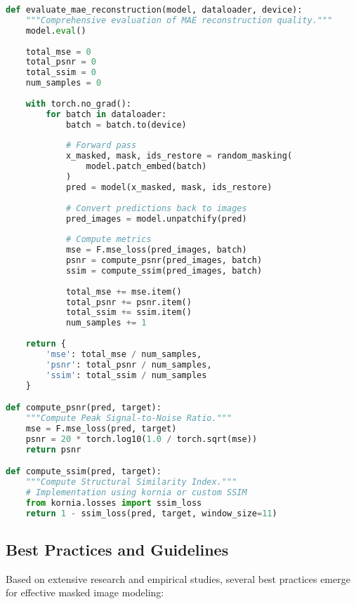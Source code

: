 \begin{lstlisting}[language=Python, caption=Comprehensive evaluation of MAE reconstruction quality]
def evaluate_mae_reconstruction(model, dataloader, device):
    """Comprehensive evaluation of MAE reconstruction quality."""
    model.eval()
    
    total_mse = 0
    total_psnr = 0
    total_ssim = 0
    num_samples = 0
    
    with torch.no_grad():
        for batch in dataloader:
            batch = batch.to(device)
            
            # Forward pass
            x_masked, mask, ids_restore = random_masking(
                model.patch_embed(batch)
            )
            pred = model(x_masked, mask, ids_restore)
            
            # Convert predictions back to images
            pred_images = model.unpatchify(pred)
            
            # Compute metrics
            mse = F.mse_loss(pred_images, batch)
            psnr = compute_psnr(pred_images, batch)
            ssim = compute_ssim(pred_images, batch)
            
            total_mse += mse.item()
            total_psnr += psnr.item()
            total_ssim += ssim.item()
            num_samples += 1
    
    return {
        'mse': total_mse / num_samples,
        'psnr': total_psnr / num_samples,
        'ssim': total_ssim / num_samples
    }

def compute_psnr(pred, target):
    """Compute Peak Signal-to-Noise Ratio."""
    mse = F.mse_loss(pred, target)
    psnr = 20 * torch.log10(1.0 / torch.sqrt(mse))
    return psnr

def compute_ssim(pred, target):
    """Compute Structural Similarity Index."""
    # Implementation using kornia or custom SSIM
    from kornia.losses import ssim_loss
    return 1 - ssim_loss(pred, target, window_size=11)
\end{lstlisting}

\subsection{Best Practices and Guidelines}

Based on extensive research and empirical studies, several best practices emerge for effective masked image modeling:

